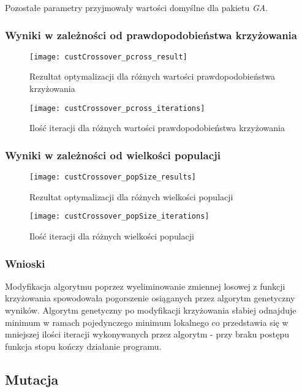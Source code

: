 Pozostałe parametry przyjmowały wartości domyślne dla pakietu \textit{GA}.
\subsubsection{Wyniki w zależności od prawdopodobieństwa krzyżowania}
\begin{figure}[H]
	\centering
	\texttt{[image: custCrossover\_pcross\_result]}
	\caption{Rezultat optymalizacji dla różnych wartości prawdopodobieństwa krzyżowania}

\end{figure}

\begin{figure}[H]
	\centering
	\texttt{[image: custCrossover\_pcross\_iterations]}
	\caption{Ilość iteracji dla różnych wartości prawdopodobieństwa krzyżowania}
\end{figure}


\subsubsection{Wyniki w zależności od wielkości populacji}

\begin{figure}[H]
	\centering
	\texttt{[image: custCrossover\_popSize\_results]}
	\caption{Rezultat optymalizacji dla różnych wielkości populacji}

\end{figure}

\begin{figure}[H]
	\centering
	\texttt{[image: custCrossover\_popSize\_iterations]}
	\caption{Ilość iteracji dla różnych wielkości populacji}
\end{figure}

\subsubsection{Wnioski}

Modyfikacja algorytmu poprzez wyeliminowanie zmiennej losowej z funkcji krzyżowania spowodowała pogorszenie osiąganych przez algorytm genetyczny wyników.
Algorytm genetyczny po modyfikacji krzyżowania słabiej odnajduje minimum w ramach pojedynczego minimum lokalnego co przedstawia się w
mniejszej ilości iteracji wykonywanych przez algorytm - przy braku postępu funkcja stopu kończy działanie programu.

\newpage

\subsection{Mutacja}

